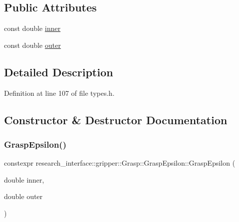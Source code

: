 \subsection*{Public Attributes}
\begin{DoxyCompactItemize}
\item 
const double \hyperlink{structresearch__interface_1_1gripper_1_1Grasp_1_1GraspEpsilon_a380022de09288513e27ee07b3779ebec}{inner}
\item 
const double \hyperlink{structresearch__interface_1_1gripper_1_1Grasp_1_1GraspEpsilon_a9d00f5f20a740391ce1c622b0c93fcf3}{outer}
\end{DoxyCompactItemize}


\subsection{Detailed Description}


Definition at line 107 of file types.\+h.



\subsection{Constructor \& Destructor Documentation}
\mbox{\label{structresearch__interface_1_1gripper_1_1Grasp_1_1GraspEpsilon_a2823c4e98498051b60afab638b679778}} 
\subsubsection{\texorpdfstring{Grasp\+Epsilon()}{GraspEpsilon()}}
{\footnotesize\ttfamily constexpr research\+\_\+interface\+::gripper\+::\+Grasp\+::\+Grasp\+Epsilon\+::\+Grasp\+Epsilon (\begin{DoxyParamCaption}\item[{double}]{inner,  }\item[{double}]{outer }\end{DoxyParamCaption})\hspace{0.3cm}{\ttfamily [inline]}}



